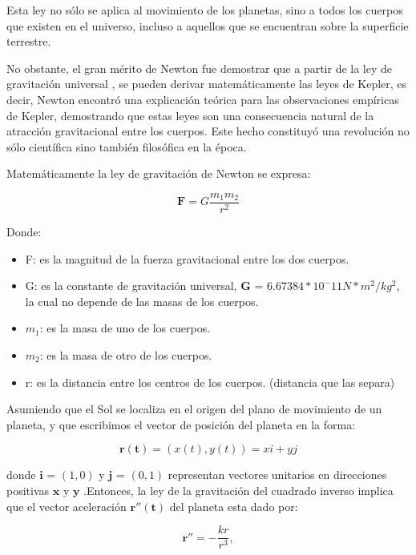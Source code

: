 \documentclass{article}
\begin{document}
	Esta ley no sólo se aplica al movimiento de los planetas, sino a todos los cuerpos que existen en el universo, incluso a aquellos que se encuentran sobre la superficie terrestre.
	
	No obstante, el gran mérito de Newton fue demostrar que	a partir de la ley de gravitación universal , se pueden derivar matemáticamente las leyes de Kepler, es decir, Newton encontró una explicación teórica para las observaciones empíricas de Kepler, demostrando que estas leyes son una consecuencia natural de la atracción gravitacional entre los cuerpos. Este hecho constituyó una revolución no sólo científica sino también filosófica en la época.
	
	Matemáticamente la ley de gravitación de Newton se expresa:
	
	\begin{equation*}
		\mathbf{F} = G \frac{m_{1} m_{2}}{r^2}
	\end{equation*}
	
	Donde:
	
	\begin{itemize}
		\item F: es la magnitud de la fuerza gravitacional entre los dos cuerpos.
		\item G: es la constante de gravitación universal, $\mathbf{G}$ = $6.67384*10^-11 N*m^2/kg^2$, la cual no depende de las masas de los cuerpos.
		\item $m_{1}$: es la masa de uno de los cuerpos.
		\item $m_{2}$: es la masa de otro de los cuerpos.
		\item r: es la distancia entre los  centros de los cuerpos. (distancia que las separa)
	\end{itemize}
	
	Asumiendo que el Sol se localiza en el origen del plano de movimiento de un 
	planeta, y que escribimos el vector de posición del planeta en la forma:
	
	\begin{equation}
		\mathbf{r(t)} = (x(t),y(t)) = xi + yj
	\end{equation}
	
	
	donde $\mathbf{i}$ = $(1, 0)$  y $\mathbf{j}$ = $(0, 1)$ representan vectores unitarios en direcciones positivas $\mathbf{x}$ y $\mathbf{y}$ .Entonces, la ley de la gravitación del cuadrado inverso implica que el vector aceleración $\mathbf{r''(t)}$  del planeta esta dado por:
	
	
	\begin{equation}
		\mathbf{r''} = -\frac{kr}{r^3},
	\end{equation}
	
\end{document}
